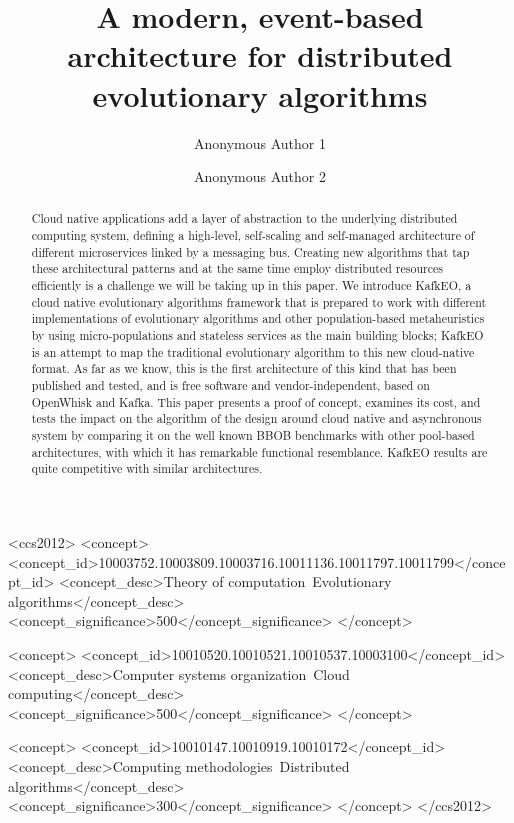 \documentclass[sigconf]{acmart}
\begin{document}
\title{A modern, event-based architecture for distributed evolutionary algorithms}

\author{Anonymous Author 1}

\author{Anonymous Author 2}

\renewcommand{\shortauthors}{A. Author et al.}


\begin{abstract}
   Cloud native applications add a layer of abstraction to the
underlying distributed computing system, defining a high-level,
self-scaling and self-managed architecture of different microservices
linked by a messaging bus. Creating new algorithms that tap these
architectural patterns and at the same time employ distributed
resources efficiently is a challenge we will be taking up in this
paper. We introduce KafkEO, a cloud native evolutionary algorithms
framework that is prepared to work with different implementations of evolutionary
algorithms and other population-based metaheuristics by using
micro-populations and stateless services as the main building
blocks; KafkEO is an attempt to map the traditional evolutionary
algorithm to this new cloud-native format. As far as we know, this is the first
architecture of this kind that has been published and tested, and is free 
software and vendor-independent, based on OpenWhisk and Kafka. 
This paper presents a proof of concept, examines its cost, and tests 
the impact on the algorithm of the design around
cloud native and asynchronous system by comparing it on
the well known BBOB benchmarks with other pool-based architectures,
with which it has remarkable functional resemblance. KafkEO results are 
quite competitive with similar architectures.
\end{abstract}

\begin{CCSXML}
<ccs2012>
<concept>
<concept_id>10003752.10003809.10003716.10011136.10011797.10011799</concept_id>
<concept_desc>Theory of computation~Evolutionary algorithms</concept_desc>
<concept_significance>500</concept_significance>
</concept>

<concept>
<concept_id>10010520.10010521.10010537.10003100</concept_id>
<concept_desc>Computer systems organization~Cloud computing</concept_desc>
<concept_significance>500</concept_significance>
</concept>

<concept>
<concept_id>10010147.10010919.10010172</concept_id>
<concept_desc>Computing methodologies~Distributed algorithms</concept_desc>
<concept_significance>300</concept_significance>
</concept>
</ccs2012>
\end{CCSXML}
\end{document}
